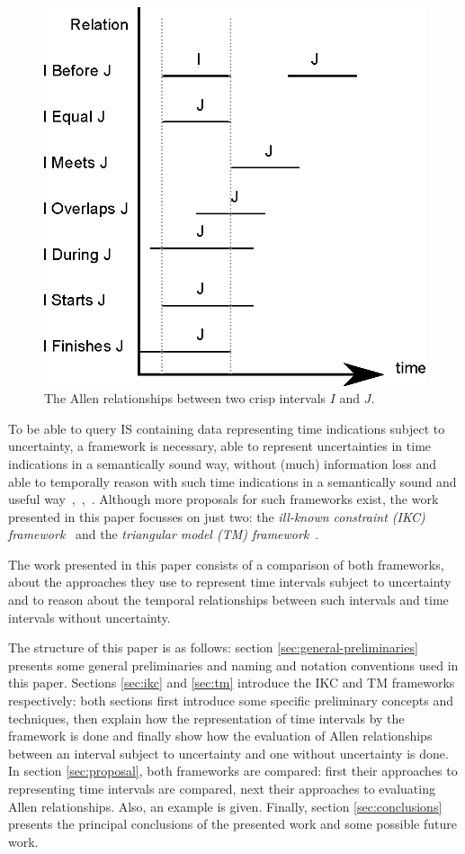 \begin{figure}[h]
   \centering
   \includegraphics[width=0.9\columnwidth]{graphs/allen.eps}
   \caption{The Allen relationships between two crisp intervals $I$ and $J$.  }
   \label{fig:allen-relationships}
 \end{figure}

To be able to query IS containing data representing time indications subject to uncertainty, a framework is necessary, able to represent uncertainties in time indications in a semantically sound way, without (much) information loss and able to temporally reason with such time indications in a semantically sound and useful way~\cite{Dubois2003},~\cite{Dubois2007},~\cite{Dubois1983}. Although more proposals for such frameworks exist, the work presented in this paper focusses on just two: the \emph{ill-known constraint \emph{(IKC)} framework}~\cite{Pons2011} and the \emph{triangular model \emph{(TM)} framework}~\cite{DeTre2012}.

The work presented in this paper consists of a comparison of both frameworks, about the approaches they use to represent time intervals subject to uncertainty and to reason about the temporal relationships between such intervals and time intervals without uncertainty.

The structure of this paper is as follows: section \ref{sec:general-preliminaries} presents some general preliminaries and naming and notation conventions used in this paper. Sections \ref{sec:ikc} and \ref{sec:tm} introduce the IKC and TM frameworks respectively: both sections first introduce some specific preliminary concepts and techniques, then explain how the representation of time intervals by the framework is done and finally show how the evaluation of Allen relationships between an interval subject to uncertainty and one without uncertainty is done. In section \ref{sec:proposal}, both frameworks are compared: first their approaches to representing time intervals are compared, next their approaches to evaluating Allen relationships. Also, an example is given. Finally, section \ref{sec:conclusions} presents the principal conclusions of the presented work and some possible future work.